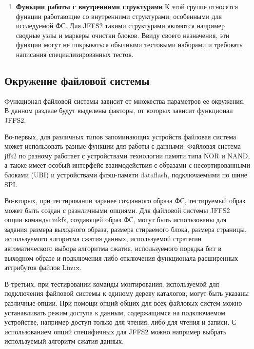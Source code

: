 \begin{enumerate}
	\item \textbf{Функции работы с внутренними структурами}
	К этой группе относятся функции работающие со внутренними структурами, особенными для исследуемой ФС. Для JFFS2 такими структурами являются например сводные узлы и маркеры очистки блоков. Ввиду своего назначения, эти функции могут не покрываться обычными тестовыми наборами и требовать написания специализированных тестов.
\end{enumerate}

\subsection{Окружение файловой системы}

Функционал файловой системы зависит от множества параметров ее окружения. В данном разделе будут выделены факторы, от которых зависит функционал JFFS2.

Во-первых, для различных типов запоминающих устройств файловая система может использовать разные функции для работы с данными. Файловая система jffs2 по разному работает с устройствами технологии памяти типа NOR и NAND, а также имеет особый интерфейс взаимодействия с образами с несортированными блоками (UBI) \cite{ubi} и устройствами флэш-памяти dataflash, подключаемыми по шине SPI. 

Во-вторых, при тестировании заранее созданного образа ФС, тестируемый образ может быть создан с разнличными опциями. Для файловой системы JFFS2 опции команды mkfs, создающей образ ФС, могут быть использованы для задания размера выходного образа, размера стираемого блока, размера страницы, используемого алгоритма сжатия данных, используемой стратегии автоматического выбора алгоритма сжатия, используемого порядка бит в выходном образе и подключения либо отключения функционала расширенных аттрибутов файлов Linux. 

В-третьих, при тестировании команды монтирования, используемой для подключения файловой системы к единому дереву каталогов, могут быть указаны различные опции. При помощи опций общих для всех файловых систем можно устанавливать режим доступа к данным, содержащимся на подключаемом устройстве, например доступ только для чтения, либо для чтения и записи. С использованием опций специфичных для JFFS2 можно например выбрать используемый алгоритм сжатия данных.


